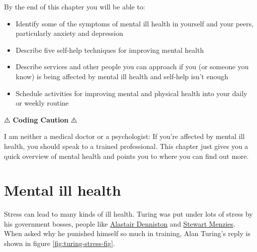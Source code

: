 \documentclass[
]{book}
\providecommand{\tightlist}{%
  \setlength{\itemsep}{0pt}\setlength{\parskip}{0pt}}
\begin{document}
By the end of this chapter you will be able to:

\begin{itemize}
\tightlist
\item
  Identify some of the symptoms of mental ill health in yourself and your peers, particularly anxiety and depression
\item
  Describe five self-help techniques for improving mental health
\item
  Describe services and other people you can approach if you (or someone you know) is being affected by mental ill health and self-help isn't enough
\item
  Schedule activities for improving mental and physical health into your daily or weekly routine
\end{itemize}

⚠️ \textbf{Coding Caution} ⚠️

I am neither a medical doctor or a psychologist: If you're affected by mental ill health, you should speak to a trained professional. This chapter just gives you a quick overview of mental health and points you to where you can find out more.

\hypertarget{illhealth}{%
\section{Mental ill health}\label{illhealth}}

Stress can lead to many kinds of ill health. Turing was put under lots of stress by his government bosses, people like \href{https://en.wikipedia.org/wiki/Alastair_Denniston}{Alastair Denniston} and \href{https://en.wikipedia.org/wiki/Stewart_Menzies}{Stewart Menzies}. \citep{imitationgame} When asked why he punished himself so much in training, Alan Turing's reply is shown in figure \ref{fig:turing-stress-fig}.
\end{document}
